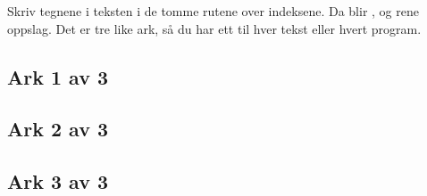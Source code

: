 
\label{kap:sporingsark}
Skriv tegnene i teksten i de tomme rutene over indeksene. Da blir ,  og  rene oppslag.
Det er tre like ark, så du har ett til hver tekst eller hvert program.



\subsection*{Ark 1 av 3}
\sporingsarkinnhold

\clearpage
\subsection*{Ark 2 av 3}
\sporingsarkinnhold

\clearpage
\subsection*{Ark 3 av 3}
\sporingsarkinnhold
